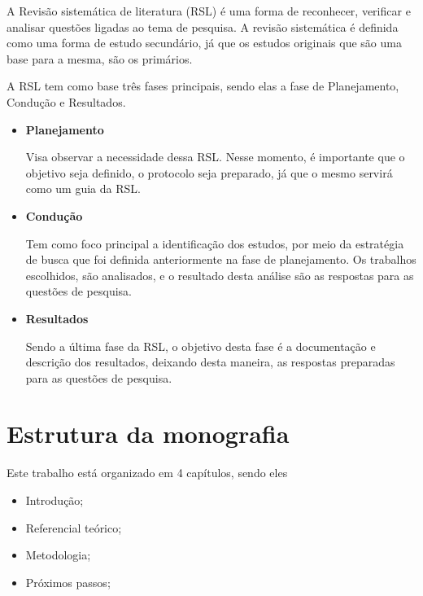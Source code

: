 A Revisão sistemática de literatura (RSL) é uma forma de reconhecer, verificar e analisar questões ligadas ao tema de pesquisa. A revisão sistemática é definida como uma forma de estudo secundário, já que os estudos originais que são uma base para a mesma, são os primários.

A RSL tem como base três fases principais, sendo elas a fase de Planejamento, Condução e Resultados.

\begin{itemize}
	\item \textbf{Planejamento}
	
	Visa observar a necessidade dessa RSL. Nesse momento, é importante que o objetivo seja definido, o protocolo seja preparado, já que o mesmo servirá como um guia da RSL.
	
	\item \textbf{Condução}
	
	Tem como foco principal a identificação dos estudos, por meio da estratégia de busca que foi definida anteriormente na fase de planejamento. Os trabalhos escolhidos, são analisados, e o resultado desta análise são as respostas para as questões de pesquisa.
	
	
	\item \textbf{Resultados}
	
	Sendo a última fase da RSL, o objetivo desta fase é a documentação e descrição dos resultados, deixando desta maneira, as respostas preparadas para as questões de pesquisa.
\end{itemize}

\section{Estrutura da monografia}

Este trabalho está organizado em 4 capítulos, sendo eles

\begin{itemize}
	\item Introdução;
	
	\item Referencial teórico;
	
	\item Metodologia;
	
	\item Próximos passos;
\end{itemize}
